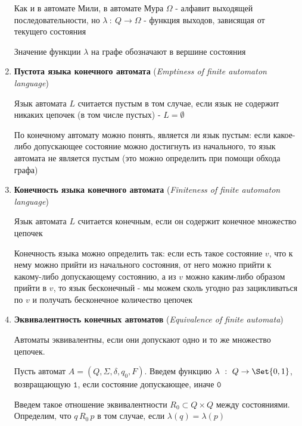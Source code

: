 \documentclass[12pt]{article}
\begin{document}
\begin{enumerate}
\begin{minipage}{\linewidth}
            Как и в автомате Мили, в автомате Мура $\Omega$ - алфавит выходящей последовательности, но
            $\lambda \ : \ Q \to \Omega$ - функция выходов, зависящая от текущего состояния

            Значение функции $\lambda$ на графе обозначают в вершине состояния

        \end{minipage}

        \smallvspace


        \item \textbf{Пустота языка конечного автомата} (\textit{Emptiness of finite automaton language})

        Язык автомата $L$ считается пустым в том случае, если язык не содержит никаких цепочек (в том числе пустых) - $L = \emptyset$

        По конечному автомату можно понять, является ли язык пустым: если какое-либо допускающее состояние можно достигнуть из начального,
        то язык автомата не является пустым (это можно определить при помощи обхода графа)

        \item \textbf{Конечность языка конечного автомата} (\textit{Finiteness of finite automaton language})

        Язык автомата $L$ считается конечным, если он содержит конечное множество цепочек

        Конечность языка можно определить так: если есть такое состояние $v$, что к нему можно прийти из начального состояния,
        от него можно прийти к какому-либо допускающему состоянию, а из $v$ можно каким-либо образом прийти в $v$, то язык бесконечный -
        мы можем сколь угодно раз зацикливаться по $v$ и получать бесконечное количество цепочек

        \item \textbf{Эквивалентность конечных автоматов} (\textit{Equivalence of finite automata})

        Автоматы эквивалентны, если они допускают одно и то же множество цепочек.

        Пусть автомат $A = (Q, \Sigma, \delta, q_0, F)$. Введем функцию $\lambda \ : \ Q \to \Set{0, 1}$, возвращающую $\mathtt{1}$, если состояние допускающее, иначе $\mathtt{0}$

        Введем такое отношение эквивалентности $R_0 \subset Q \times Q$ между состояниями. Определим, что $q \, R_0 \, p$ в том случае, если $\lambda(q) = \lambda(p)$


\end{enumerate}
\end{document}
